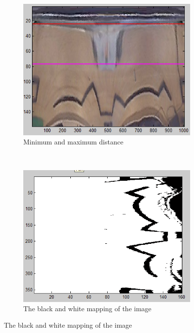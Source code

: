 \documentclass[12pt]{article}
\begin{document}
\begin{figure}[h!]
	\begin{subfigure}[b]{0.4\textwidth}
		\includegraphics[width=\textwidth]{lines.png}
		\caption{Minimum and maximum distance}
	\end{subfigure}
	~
	\begin{subfigure}[b]{0.4\textwidth}
		\includegraphics[width=\textwidth]{bw.png}
		\caption{The black and white mapping of the image}
	\end{subfigure}


\end{figure}
\end{document}
